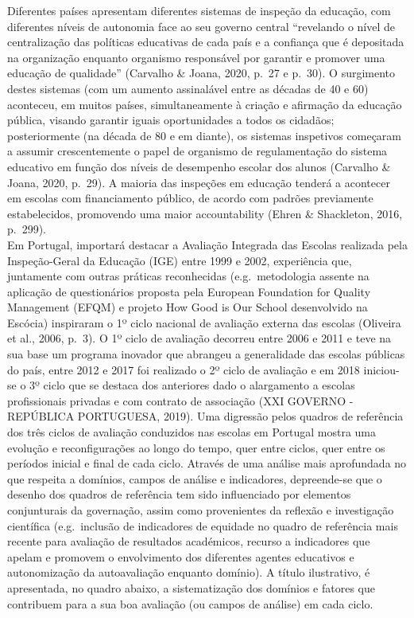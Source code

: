 \documentclass[
]{book}
\theoremstyle{definition}
\theoremstyle{definition}
\theoremstyle{definition}
\theoremstyle{definition}
\theoremstyle{remark}
\begin{document}
Diferentes países apresentam diferentes sistemas de inspeção da educação, com diferentes níveis de autonomia face ao seu governo central ``revelando o nível de centralização das políticas educativas de cada país e a confiança que é depositada na organização enquanto organismo responsável por garantir e promover uma educação de qualidade'' (Carvalho \& Joana, 2020, p.~27 e p.~30). O surgimento destes sistemas (com um aumento assinalável entre as décadas de 40 e 60) aconteceu, em muitos países, simultaneamente à criação e afirmação da educação pública, visando garantir iguais oportunidades a todos os cidadãos; posteriormente (na década de 80 e em diante), os sistemas inspetivos começaram a assumir crescentemente o papel de organismo de regulamentação do sistema educativo em função dos níveis de desempenho escolar dos alunos (Carvalho \& Joana, 2020, p.~29). A maioria das inspeções em educação tenderá a acontecer em escolas com financiamento público, de acordo com padrões previamente estabelecidos, promovendo uma maior accountability (Ehren \& Shackleton, 2016, p.~299).\\
Em Portugal, importará destacar a Avaliação Integrada das Escolas realizada pela Inspeção-Geral da Educação (IGE) entre 1999 e 2002, experiência que, juntamente com outras práticas reconhecidas (e.g.~metodologia assente na aplicação de questionários proposta pela European Foundation for Quality Management (EFQM) e projeto How Good is Our School desenvolvido na Escócia) inspiraram o 1º ciclo nacional de avaliação externa das escolas (Oliveira et al., 2006, p.~3). O 1º ciclo de avaliação decorreu entre 2006 e 2011 e teve na sua base um programa inovador que abrangeu a generalidade das escolas públicas do país, entre 2012 e 2017 foi realizado o 2º ciclo de avaliação e em 2018 iniciou-se o 3º ciclo que se destaca dos anteriores dado o alargamento a escolas profissionais privadas e com contrato de associação (XXI GOVERNO - REPÚBLICA PORTUGUESA, 2019). Uma digressão pelos quadros de referência dos três ciclos de avaliação conduzidos nas escolas em Portugal mostra uma evolução e reconfigurações ao longo do tempo, quer entre ciclos, quer entre os períodos inicial e final de cada ciclo. Através de uma análise mais aprofundada no que respeita a domínios, campos de análise e indicadores, depreende-se que o desenho dos quadros de referência tem sido influenciado por elementos conjunturais da governação, assim como provenientes da reflexão e investigação científica (e.g.~inclusão de indicadores de equidade no quadro de referência mais recente para avaliação de resultados académicos, recurso a indicadores que apelam e promovem o envolvimento dos diferentes agentes educativos e autonomização da autoavaliação enquanto domínio). A título ilustrativo, é apresentada, no quadro abaixo, a sistematização dos domínios e fatores que contribuem para a sua boa avaliação (ou campos de análise) em cada ciclo.
\end{document}
